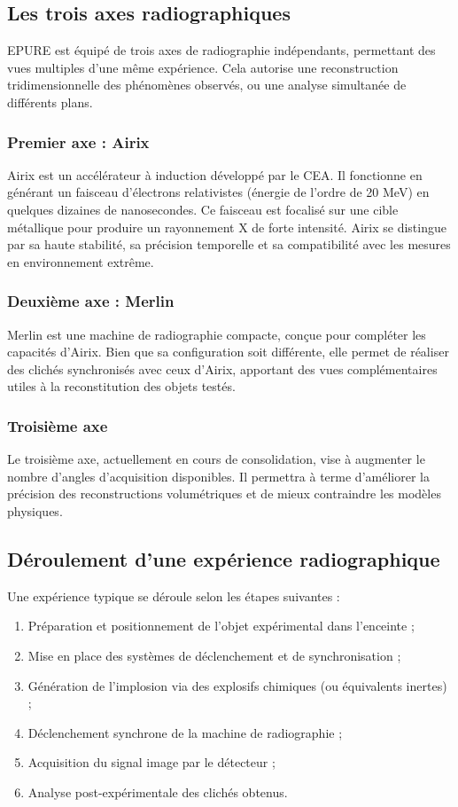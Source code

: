 \documentclass[12pt,a4paper]{report}
\begin{document}
\subsection{Les trois axes radiographiques}
EPURE est équipé de trois axes de radiographie indépendants, permettant des vues multiples d’une même expérience. Cela autorise une reconstruction tridimensionnelle des phénomènes observés, ou une analyse simultanée de différents plans.
\subsubsection{Premier axe : Airix}
Airix est un accélérateur à induction développé par le CEA. Il fonctionne en générant un faisceau d’électrons relativistes (énergie de l’ordre de 20 MeV) en quelques dizaines de nanosecondes. Ce faisceau est focalisé sur une cible métallique pour produire un rayonnement X de forte intensité. Airix se distingue par sa haute stabilité, sa précision temporelle et sa compatibilité avec les mesures en environnement extrême.

\subsubsection{Deuxième axe : Merlin}
Merlin est une machine de radiographie compacte, conçue pour compléter les capacités d’Airix. Bien que sa configuration soit différente, elle permet de réaliser des clichés synchronisés avec ceux d’Airix, apportant des vues complémentaires utiles à la reconstitution des objets testés.

\subsubsection{Troisième axe}
Le troisième axe, actuellement en cours de consolidation, vise à augmenter le nombre d’angles d’acquisition disponibles. Il permettra à terme d’améliorer la précision des reconstructions volumétriques et de mieux contraindre les modèles physiques.

\subsection{Déroulement d'une expérience radiographique}
Une expérience typique se déroule selon les étapes suivantes :
\begin{enumerate}
\item Préparation et positionnement de l’objet expérimental dans l’enceinte ;
\item Mise en place des systèmes de déclenchement et de synchronisation ;
\item Génération de l’implosion via des explosifs chimiques (ou équivalents inertes) ;
\item Déclenchement synchrone de la machine de radiographie ;
\item Acquisition du signal image par le détecteur ;
\item Analyse post-expérimentale des clichés obtenus.
\end{enumerate}
\end{document}
